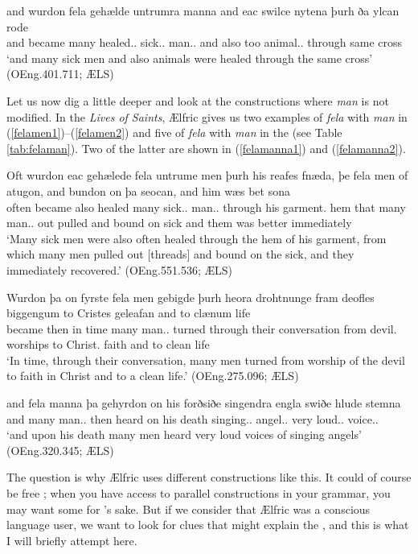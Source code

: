 \documentclass[output=paper,colorlinks,citecolor=brown]{langscibook}
\begin{document}
\ea\label{untrumramanna}
\gll and wurdon fela gehælde untrumra manna and eac swilce nytena þurh ða ylcan rode\\
and became many healed.\NOM.\PL{} sick.\GEN.\PL{} man.\GEN.\PL{} and also too animal.\GEN.\PL{} through \DEF{} same cross\\
\glt ‘and many sick men and also animals were healed through the same cross’ (OEng.401.711; ÆLS)
\z

Let us now dig a little deeper and look at the constructions where \textit{man} is not modified. In the \textit{Lives of Saints}, Ælfric gives us two examples of \textit{fela} with \textit{man} in  (\ref{felamen1})–(\ref{felamen2}) and five of \textit{fela} with \textit{man} in the  (see Table \ref{tab:felaman}). Two of the latter are shown in (\ref{felamanna1}) and (\ref{felamanna2}).

\ea\label{felamen1}
\gll Oft wurdon eac gehælede fela untrume men þurh his reafes fnæda, þe fela men of atugon, and bundon on þa seocan, and him wæs bet sona\\
often became also healed many sick.\NOM.\PL{} man.\NOM.\PL{} through his garment.\GEN{} hem that many man.\NOM.\PL{} out pulled and bound on \DEF{} sick and them was better immediately\\
\glt ‘Many sick men were also often healed through the hem of his garment, from which many men pulled out [threads] and bound on the sick, and they immediately recovered.’ (OEng.551.536; ÆLS)
\z


\ea\label{felamen2}
\gll Wurdon þa on fyrste fela men gebigde þurh heora drohtnunge fram deofles biggengum to Cristes geleafan and to clænum life\\
became then in time many man.\NOM.\PL{} turned through their conversation from devil.\GEN{} worships to Christ.\GEN{} faith and to clean life\\
\glt ‘In time, through their conversation, many men turned from worship of the devil to faith in Christ and to a clean life.’ (OEng.275.096; ÆLS)
\z


\ea\label{felamanna1}
\gll and fela manna þa gehyrdon on his forðsiðe singendra engla swiðe hlude stemna\\
and many man.\GEN.\PL{} then heard on his death singing.\GEN.\PL{} angel.\GEN.\PL{} very loud.\ACC.\PL{} voice.\ACC.\PL{}\\
\glt ‘and upon his death many men heard very loud voices of singing angels’ (OEng.320.345; ÆLS)
\z


The question is why Ælfric uses different constructions like this. It could of course be free ; when you have access to parallel constructions in your grammar, you may want some  for ’s sake. But if we consider that Ælfric was a conscious language user, we want to look for clues that might explain the , and this is what I will briefly attempt here. 
\end{document}
